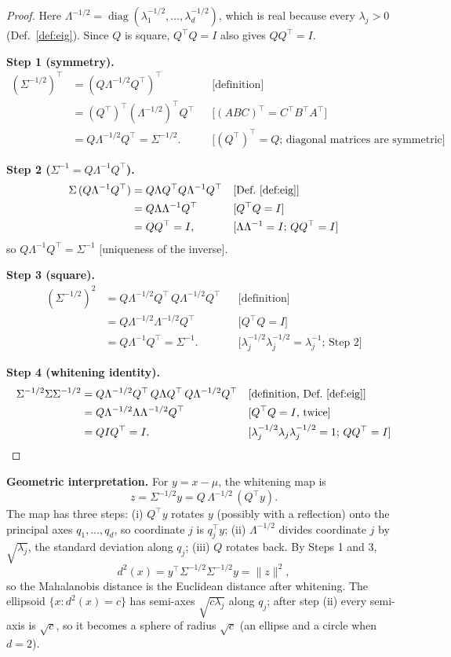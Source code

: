 \documentclass[11pt]{article}
\theoremstyle{definition}
\newcommand{\T}{^{\top}}
\newcommand{\diag}{\operatorname{diag}}
\newcommand{\rul}[1]{\text{[#1]}}
\begin{document}
\begin{proof}
Here $\Lambda^{-1/2}=\diag(\lambda_1^{-1/2},\dots,\lambda_d^{-1/2})$, which is real because every $\lambda_j>0$ (Def.~\ref{def:eig}). Since $Q$ is square, $Q\T Q=I$ also gives $QQ\T=I$.

\textbf{Step 1 (symmetry).}
\begin{align*}
(\Sigma^{-1/2})\T &= (Q\Lambda^{-1/2}Q\T)\T && \rul{definition}\\
&= (Q\T)\T(\Lambda^{-1/2})\T Q\T && \rul{$(ABC)\T=C\T B\T A\T$}\\
&= Q\Lambda^{-1/2}Q\T=\Sigma^{-1/2}. && \rul{$(Q\T)\T=Q$; diagonal matrices are symmetric}
\end{align*}

\textbf{Step 2 ($\Sigma^{-1}=Q\Lambda^{-1}Q\T$).}
\begin{align*}
\Sigma\,(Q\Lambda^{-1}Q\T) &= Q\Lambda Q\T Q\Lambda^{-1}Q\T && \rul{Def.~\ref{def:eig}}\\
&= Q\Lambda\Lambda^{-1}Q\T && \rul{$Q\T Q=I$}\\
&= QQ\T=I, && \rul{$\Lambda\Lambda^{-1}=I$; $QQ\T=I$}
\end{align*}
so $Q\Lambda^{-1}Q\T=\Sigma^{-1}$ [uniqueness of the inverse].

\textbf{Step 3 (square).}
\begin{align*}
(\Sigma^{-1/2})^2 &= Q\Lambda^{-1/2}Q\T\,Q\Lambda^{-1/2}Q\T && \rul{definition}\\
&= Q\Lambda^{-1/2}\Lambda^{-1/2}Q\T && \rul{$Q\T Q=I$}\\
&= Q\Lambda^{-1}Q\T=\Sigma^{-1}. && \rul{$\lambda_j^{-1/2}\lambda_j^{-1/2}=\lambda_j^{-1}$; Step 2}
\end{align*}

\textbf{Step 4 (whitening identity).}
\begin{align*}
\Sigma^{-1/2}\Sigma\Sigma^{-1/2} &= Q\Lambda^{-1/2}Q\T\,Q\Lambda Q\T\,Q\Lambda^{-1/2}Q\T && \rul{definition, Def.~\ref{def:eig}}\\
&= Q\Lambda^{-1/2}\Lambda\Lambda^{-1/2}Q\T && \rul{$Q\T Q=I$, twice}\\
&= QIQ\T=I. && \rul{$\lambda_j^{-1/2}\lambda_j\lambda_j^{-1/2}=1$; $QQ\T=I$}
\end{align*}
\end{proof}

\noindent\textbf{Geometric interpretation.} For $y=x-\mu$, the whitening map is
\[
z=\Sigma^{-1/2}y=Q\,\Lambda^{-1/2}\,(Q\T y).
\]
The map has three steps: (i) $Q\T y$ rotates $y$ (possibly with a reflection) onto the principal axes $q_1,\dots,q_d$, so coordinate $j$ is $q_j\T y$; (ii) $\Lambda^{-1/2}$ divides coordinate $j$ by $\sqrt{\lambda_j}$, the standard deviation along $q_j$; (iii) $Q$ rotates back. By Steps 1 and 3,
\[
d^2(x)=y\T\Sigma^{-1/2}\Sigma^{-1/2}y=\|z\|^2,
\]
so the Mahalanobis distance is the Euclidean distance after whitening. The ellipsoid $\{x:d^2(x)=c\}$ has semi-axes $\sqrt{c\lambda_j}$ along $q_j$; after step (ii) every semi-axis is $\sqrt c$, so it becomes a sphere of radius $\sqrt c$ (an ellipse and a circle when $d=2$).
\end{document}
